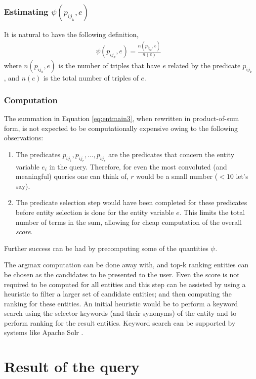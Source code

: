 \documentclass[a4paper, twoside, 12pt]{report}
\begin{document}
\subsubsection{Estimating $\psi(p_{ij_{k}}, e)$}
It is natural to have the following definition,
\begin{align}
\psi(p_{ij_{k}}, e) = \frac{n(p_{ij_{k}}, e)}{n(e)}
\end{align}
where $n(p_{ij_{k}}, e)$ is the number of triples that have $e$ related by the predicate $p_{ij_{k}}$, and $n(e)$ is the total number of triples of $e$.

\subsubsection{Computation}
The summation in Equation \ref{eq:entmain3}, when rewritten in product-of-sum form, is not expected to be computationally expensive owing to the following observations:
\begin{enumerate}
  \item The predicates $p_{ij_1}, p_{ij_r}, ..., p_{ij_r}$ are the predicates that concern the entity variable $e_i$ in the query. Therefore, for even the most convoluted (and meaningful) queries one can think of, $r$ would be a small number ($< 10$ let's say).
  \item The predicate selection step would have been completed for these predicates before entity selection is done for the entity variable $e$. This limits the total number of terms in the sum, allowing for cheap computation of the overall \emph{score}.
\end{enumerate}

Further success can be had by precomputing some of the quantities $\psi$.

The argmax computation can be done away with, and top-k ranking entities can be chosen as the candidates to be presented to the user. Even the score is not required to be computed for all entities and this step can be assisted by using a heuristic to filter a larger set of candidate entities; and then computing the ranking for these entities. An initial heuristic would be to perform a keyword search using the selector keywords (and their synonyms) of the entity and to perform ranking for the result entities. Keyword search can be supported by systems like Apache Solr \cite{smiley2015apache}.

\section{Result of the query}
\end{document}
